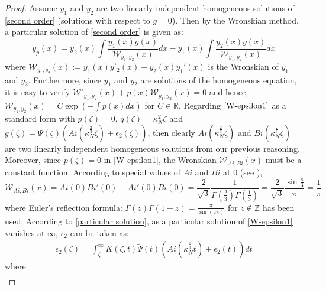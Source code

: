 \documentclass[11pt]{article}
\numberwithin{equation}{section}%
\numberwithin{theorem}{section}
\begin{document}
\begin{proof}
    Assume $y_1$ and $y_2$ are two linearly independent homogeneous solutions of \eqref{second order} (solutions with respect to $g=0$). Then by the Wronskian method, a particular solution of \eqref{second order} is given as:
    \begin{equation}\label{particular solution}
        y_p(x)=y_2(x)\int\frac{y_1(x)g(x)}{\mathcal{W}_{y_1,y_2}(x)}dx-y_1(x)\int\frac{y_2(x)g(x)}{\mathcal{W}_{y_1,y_2}(x)}dx
    \end{equation}
    where $\mathcal{W}_{y_1,y_2}(x):=y_1(x)y'_2(x)-y_2(x)y_1'(x)$ is the Wronskian of $y_1$ and $y_2$. Furthermore, since $y_1$ and $y_2$ are solutions of the homogeneous equation, it is easy to verify $\mathcal{W}'_{y_1,y_2}(x)+p(x)\mathcal{W}_{y_1,y_2}(x)=0$ and hence, $\mathcal{W}_{y_1,y_2}(x)=C\exp\left(-\int p(x)dx\right)$ for $C\in\mathbb{R}$. Regarding $\eqref{W-epsilon1}$ as a standard form with $p(\zeta)=0$, $q(\zeta)=\kappa_N^2\zeta$ and $g(\zeta)=\Psi(\zeta)\left(Ai\left(\kappa_N^\frac{2}{3}\zeta\right)+\epsilon_2(\zeta)\right)$, then clearly $Ai\left(\kappa_N^\frac{2}{3}\zeta\right)$ and $Bi\left(\kappa_N^\frac{2}{3}\zeta\right)$ are two linearly independent homogeneous solutions from our previous reasoning. Moreover, since $p(\zeta)=0$ in \eqref{W-epsilon1}, the Wronskian $\mathcal{W}_{Ai,Bi}(x)$ must be a constant function. According to special values of $Ai$ and $Bi$ at $0$ (see \cite[Equation $11.1.03\&11.1.11$]{olver1997asymptotics}),
    \begin{equation}\label{W4AiBi}
              \mathcal{W}_{Ai,Bi}(x)=Ai(0)Bi'(0)-Ai'(0)Bi(0)=\frac{2}{\sqrt3}\frac{1}{\Gamma\left(\frac{2}{3}\right)\Gamma\left(\frac{1}{3}\right)}=\frac{2}{\sqrt3}\frac{\sin\frac{\pi}{3}}{\pi}=\frac{1}{\pi}
    \end{equation}
    where Euler's reflection formula: $\Gamma(z)\Gamma(1-z)=\frac{\pi}{\sin(z\pi)}$ for $z\notin\mathbb{Z}$ has been used. According to \eqref{particular solution}, as a particular solution of \eqref{W-epsilon1} vanishes at $\infty$, $\epsilon_2$ can be taken as:
    \begin{equation}\label{W-epsilon2}
        \begin{split}
            \epsilon_2(\zeta)=\int^\infty_\zeta K(\zeta,t)\tilde{\Psi}(t) \left(Ai\left(\kappa_N^\frac{2}{3}t\right)+\epsilon_2(t)\right)dt
        \end{split}
    \end{equation}
    where
    \begin{equation*}
    \begin{split}

\end{split}
\end{equation*}
\end{proof}
\end{document}
